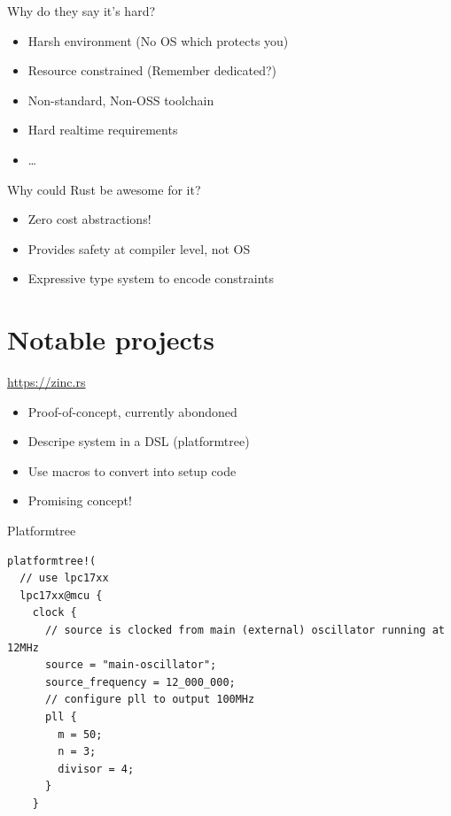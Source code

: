 \documentclass[aspectratio=1610,14pt,t]{beamer}
\begin{document}
\begin{frame}[c]{Why do they say it's hard?}
  \begin{itemize}
    \item Harsh environment (No OS which protects you)
    \item Resource constrained (Remember dedicated?)
    \item Non-standard, Non-OSS toolchain
    \item Hard realtime requirements
    \item \ldots
  \end{itemize}
\end{frame}

\begin{frame}[c]{Why could Rust be awesome for it?}
  \begin{itemize}
    \item Zero cost abstractions!
    \item Provides safety at compiler level, not OS
    \item Expressive type system to encode constraints
  \end{itemize}
\end{frame}

\section{Notable projects}

\begin{frame}[c]{\url{https://zinc.rs}}
  \begin{itemize}
      \item Proof-of-concept, currently abondoned
      \item Descripe system in a DSL (platformtree)
      \item Use macros to convert into setup code
      \item Promising concept!
  \end{itemize}
\end{frame}

\begin{frame}[c,fragile]{Platformtree}
  \begin{verbatim}
platformtree!(
  // use lpc17xx
  lpc17xx@mcu {
    clock {
      // source is clocked from main (external) oscillator running at 12MHz
      source = "main-oscillator";
      source_frequency = 12_000_000;
      // configure pll to output 100MHz
      pll {
        m = 50;
        n = 3;
        divisor = 4;
      }
    }
  \end{verbatim}
\end{frame}
\end{document}
